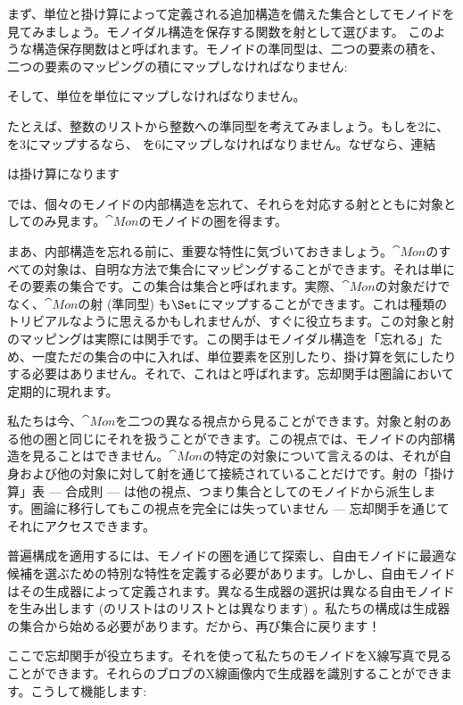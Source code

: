 まず、単位と掛け算によって定義される追加構造を備えた集合としてモノイドを見てみましょう。モノイダル構造を保存する関数を射として選びます。
このような構造保存関数はと呼ばれます。モノイドの準同型は、二つの要素の積を、
二つの要素のマッピングの積にマップしなければなりません: 

そして、単位を単位にマップしなければなりません。

たとえば、整数のリストから整数への準同型を考えてみましょう。もし\code{{[}2{]}}を2に、\code{{[}3{]}}を3にマップするなら、
\code{{[}2, 3{]}}を6にマップしなければなりません。なぜなら、連結

は掛け算になります

では、個々のモノイドの内部構造を忘れて、それらを対応する射とともに対象としてのみ見ます。$\cat{Mon}$のモノイドの圏を得ます。

まあ、内部構造を忘れる前に、重要な特性に気づいておきましょう。$\cat{Mon}$のすべての対象は、自明な方法で集合にマッピングすることができます。それは単にその要素の集合です。この集合は集合と呼ばれます。実際、$\cat{Mon}$の対象だけでなく、$\cat{Mon}$の射 (準同型) も$\Set$にマップすることができます。これは種類のトリビアルなように思えるかもしれませんが、すぐに役立ちます。この対象と射のマッピングは実際には関手です。この関手はモノイダル構造を「忘れる」ため、一度ただの集合の中に入れば、単位要素を区別したり、掛け算を気にしたりする必要はありません。それで、これはと呼ばれます。忘却関手は圏論において定期的に現れます。

私たちは今、$\cat{Mon}$を二つの異なる視点から見ることができます。対象と射のある他の圏と同じにそれを扱うことができます。この視点では、モノイドの内部構造を見ることはできません。$\cat{Mon}$の特定の対象について言えるのは、それが自身および他の対象に対して射を通じて接続されていることだけです。射の「掛け算」表 --- 合成則 --- は他の視点、つまり集合としてのモノイドから派生します。圏論に移行してもこの視点を完全には失っていません --- 忘却関手を通じてそれにアクセスできます。

普遍構成を適用するには、モノイドの圏を通じて探索し、自由モノイドに最適な候補を選ぶための特別な特性を定義する必要があります。しかし、自由モノイドはその生成器によって定義されます。異なる生成器の選択は異なる自由モノイドを生み出します (のリストはのリストとは異なります) 。私たちの構成は生成器の集合から始める必要があります。だから、再び集合に戻ります！

ここで忘却関手が役立ちます。それを使って私たちのモノイドをX線写真で見ることができます。それらのブロブのX線画像内で生成器を識別することができます。こうして機能します: 

